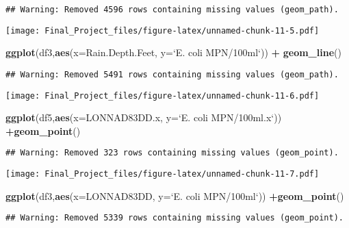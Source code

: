 \documentclass[
]{article}
\newenvironment{Shaded}{\begin{snugshade}}{\end{snugshade}}
\newcommand{\DataTypeTok}[1]{\textcolor[rgb]{0.13,0.29,0.53}{#1}}
\newcommand{\KeywordTok}[1]{\textcolor[rgb]{0.13,0.29,0.53}{\textbf{#1}}}
\newcommand{\NormalTok}[1]{#1}
\newcommand{\OperatorTok}[1]{\textcolor[rgb]{0.81,0.36,0.00}{\textbf{#1}}}
\newcommand{\StringTok}[1]{\textcolor[rgb]{0.31,0.60,0.02}{#1}}
\begin{document}
\begin{verbatim}
## Warning: Removed 4596 rows containing missing values (geom_path).
\end{verbatim}

\texttt{[image: Final\_Project\_files/figure-latex/unnamed-chunk-11-5.pdf]}

\begin{Shaded}
\begin{Highlighting}[]
\KeywordTok{ggplot}\NormalTok{(df3,}\KeywordTok{aes}\NormalTok{(}\DataTypeTok{x=}\NormalTok{Rain.Depth.Feet, }\DataTypeTok{y=}\StringTok{`}\DataTypeTok{E. coli MPN/100ml}\StringTok{`}\NormalTok{)) }\OperatorTok{+}
\StringTok{  }\KeywordTok{geom_line}\NormalTok{()}
\end{Highlighting}
\end{Shaded}

\begin{verbatim}
## Warning: Removed 5491 rows containing missing values (geom_path).
\end{verbatim}

\texttt{[image: Final\_Project\_files/figure-latex/unnamed-chunk-11-6.pdf]}

\begin{Shaded}
\begin{Highlighting}[]
\KeywordTok{ggplot}\NormalTok{(df5,}\KeywordTok{aes}\NormalTok{(}\DataTypeTok{x=}\NormalTok{LONNAD83DD.x, }\DataTypeTok{y=}\StringTok{`}\DataTypeTok{E. coli MPN/100ml.x}\StringTok{`}\NormalTok{)) }\OperatorTok{+}\KeywordTok{geom_point}\NormalTok{()}
\end{Highlighting}
\end{Shaded}

\begin{verbatim}
## Warning: Removed 323 rows containing missing values (geom_point).
\end{verbatim}

\texttt{[image: Final\_Project\_files/figure-latex/unnamed-chunk-11-7.pdf]}

\begin{Shaded}
\begin{Highlighting}[]
\KeywordTok{ggplot}\NormalTok{(df3,}\KeywordTok{aes}\NormalTok{(}\DataTypeTok{x=}\NormalTok{LONNAD83DD, }\DataTypeTok{y=}\StringTok{`}\DataTypeTok{E. coli MPN/100ml}\StringTok{`}\NormalTok{)) }\OperatorTok{+}\KeywordTok{geom_point}\NormalTok{()}
\end{Highlighting}
\end{Shaded}

\begin{verbatim}
## Warning: Removed 5339 rows containing missing values (geom_point).
\end{verbatim}
\end{document}
